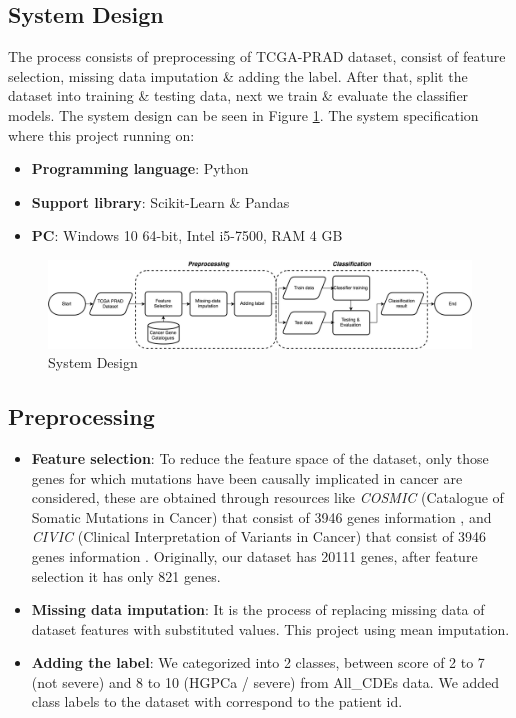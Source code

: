 \documentclass[a4paper,oneside]{article}
\begin{document}
\subsection{System Design}
The process consists of preprocessing of TCGA-PRAD dataset, consist of feature selection, missing data imputation \& adding the label. After that, split the dataset into training \& testing data, next we train \& evaluate the classifier models. The system design can be seen in Figure \ref{fig:system_design}. The system specification where this project running on:
\begin{itemize}
\item \textbf{Programming language}: Python
\item \textbf{Support library}: Scikit-Learn \& Pandas
\item \textbf{PC}: Windows 10 64-bit, Intel i5-7500, RAM 4 GB
\end{itemize}

\begin{figure}
  \includegraphics[width=1\linewidth]{system_design}
  \centering
  \caption{System Design}
  \label{fig:system_design}
\end{figure}

\subsection{Preprocessing}
\begin{itemize}
\item \textbf{Feature selection}: To reduce the feature space of the dataset, only those genes for which mutations have been causally implicated in cancer are considered, these are obtained through resources like \textit{COSMIC} (Catalogue of Somatic Mutations in Cancer) that consist of 3946 genes information \cite{cosmicdata}, and \textit{CIVIC} (Clinical Interpretation of Variants in Cancer) that consist of 3946 genes information \cite{civicdata}. Originally, our dataset has 20111 genes, after feature selection it has only 821 genes.
\item \textbf{Missing data imputation}: It is the process of replacing missing data of dataset features with substituted values. This project using mean imputation.
\item \textbf{Adding the label}: We categorized into 2 classes, between score of 2 to 7 (not severe) and 8 to 10 (HGPCa / severe)  from All\_CDEs data. We added class labels to the dataset with correspond to the patient id.

\end{itemize}
\end{document}
